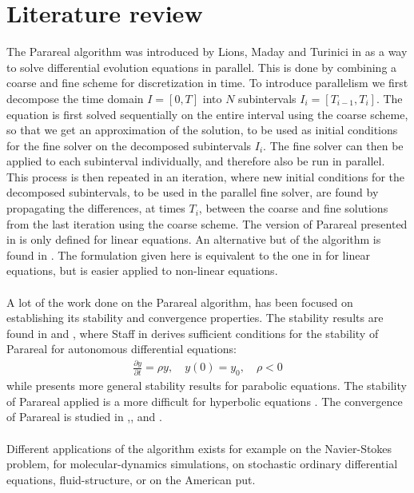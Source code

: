 \chapter{Literature review}
The Parareal algorithm was introduced by Lions, Maday and Turinici in \cite{lions2001resolution} as a way to solve differential evolution equations in parallel. This is done by combining a coarse and fine scheme for discretization in time. To introduce parallelism we first decompose the time domain $I=[0,T]$ into $N$ subintervals $I_i=[T_{i-1},T_i]$. The equation is first solved sequentially on the entire interval using the coarse scheme, so that we get an approximation of the solution, to be used as initial conditions for the fine solver on the decomposed subintervals $I_i$. The fine solver can then be applied to each subinterval individually, and therefore also be run in parallel. This process is then repeated in an iteration, where new initial conditions for the decomposed subintervals, to be used in the parallel fine solver, are found by propagating the differences, at times $T_i$, between the coarse and fine solutions from the last iteration using the coarse scheme. The version of Parareal presented in \cite{lions2001resolution} is only defined for linear equations. An alternative but  of the algorithm is found in \cite{baffico2002parallel}. The formulation given here is equivalent to the one in \cite{lions2001resolution} for linear equations, but is easier applied to non-linear equations.
\\
\\
A lot of the work done on the Parareal algorithm, has been focused on establishing its stability and convergence properties. The stability results are found in \cite{staff2005stability} and \cite{bal2005convergence}, where Staff in \cite{staff2005stability} derives sufficient conditions for the stability of Parareal for autonomous differential equations:
\begin{align}
\frac{\partial y}{\partial t} =\rho y,\quad y(0)=y_0,\quad  \rho<0 \label{autonom E}
\end{align}
while \cite{bal2005convergence} presents more general stability results for parabolic equations. The stability of Parareal applied is a more difficult for hyperbolic equations \cite{dai2013stable}. The convergence of Parareal is studied in \cite{lions2001resolution},\cite{bal2005convergence},\cite{gander2007analysis} and \cite{gander2007superlinear}.
\\
\\
Different applications of the algorithm exists for example on the Navier-Stokes problem\cite{fischer2005parareal}, for molecular-dynamics simulations\cite{baffico2002parallel}, on stochastic ordinary differential equations\cite{bal2003parallelization}, fluid-structure\cite{farhat2003time}, or on the American put\cite{bal2002parareal}.
